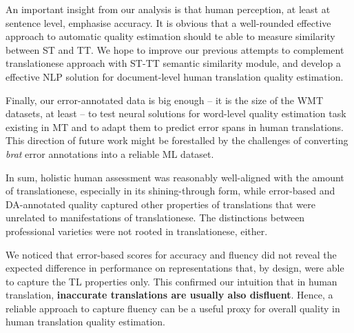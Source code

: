 An important insight from our analysis is that human perception, at least at sentence level, emphasise accuracy. It is obvious that a well-rounded effective approach to automatic quality estimation should te able to measure similarity between ST and TT. We hope to improve our previous attempts to complement translationese approach with ST-TT semantic similarity module, and develop a effective NLP solution for document-level human translation quality estimation. 

Finally, our error-annotated data is big enough -- it is the size of the WMT datasets, at least -- to test neural solutions for word-level quality estimation task existing in MT and to adapt them to predict error spans in human translations. This direction of future work might be forestalled by the challenges of converting \textit{brat} error annotations into a reliable ML dataset.    


In sum, holistic human assessment was reasonably well-aligned with the amount of translationese, especially in its shining-through form, while error-based and DA-annotated quality captured other properties of translations that were unrelated to manifestations of translationese. The distinctions between professional varieties were not rooted in translationese, either. 

We noticed that error-based scores for accuracy and fluency did not reveal the expected difference in performance on representations that, by design, were able to capture the TL properties only.
This confirmed our intuition that in human translation, \textbf{inaccurate translations are usually also disfluent}. Hence, a reliable approach to capture fluency can be a useful proxy for overall quality in human translation quality estimation.

